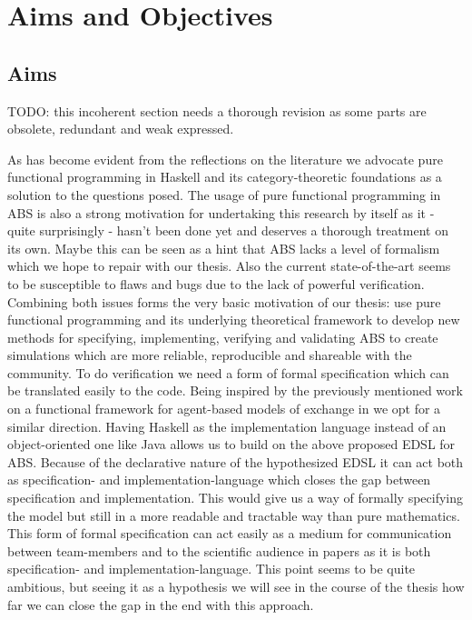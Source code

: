 \chapter{Aims and Objectives}
\label{chap:aimsObj}

\section{Aims}
TODO: this incoherent section needs a thorough revision as some parts are obsolete, redundant and weak expressed.

As has become evident from the reflections on the literature we advocate pure functional programming in Haskell and its category-theoretic foundations as a solution to the questions posed. The usage of pure functional programming in ABS is also a strong motivation for undertaking this research by itself as it - quite surprisingly - hasn't been done yet and deserves a thorough treatment on its own. Maybe this can be seen as a hint that ABS lacks a level of formalism which we hope to repair with our thesis. Also the current state-of-the-art seems to be susceptible to flaws and bugs due to the lack of powerful verification. Combining both issues forms the very basic motivation of our thesis: use pure functional programming and its underlying theoretical framework to develop new methods for specifying, implementing, verifying and validating ABS to create simulations which are more reliable, reproducible and shareable with the community.
To do verification we need a form of formal specification which can be translated easily to the code. Being inspired by the previously mentioned work on a functional framework for agent-based models of exchange in \cite{botta_functional_2011} we opt for a similar direction. Having Haskell as the implementation language instead of an object-oriented one like Java allows us to build on the above proposed EDSL for ABS. Because of the declarative nature of the hypothesized EDSL it can act both as specification- and implementation-language which closes the gap between specification and implementation. This would give us a way of formally specifying the model but still in a more readable and tractable way than pure mathematics. This form of formal specification can act easily as a medium for communication between team-members and to the scientific audience in papers as it is both specification- and implementation-language. This point seems to be quite ambitious, but seeing it as a hypothesis we will see in the course of the thesis how far we can close the gap in the end with this approach.
